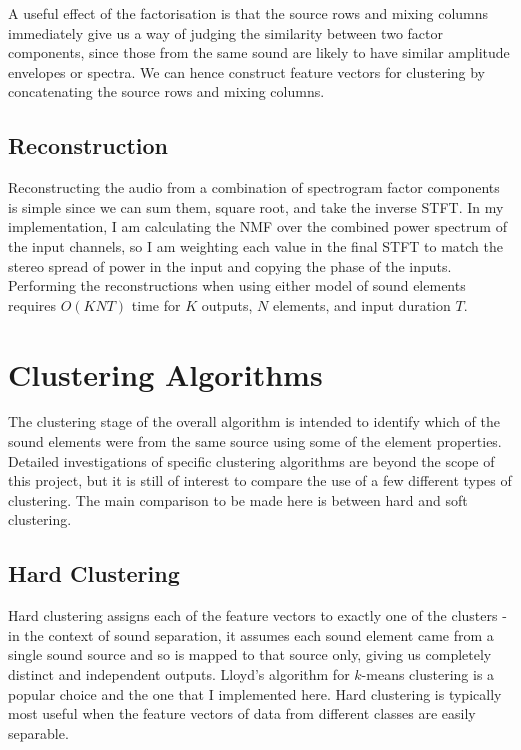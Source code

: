 \documentclass[12pt,a4paper,twoside,openright]{report}
\begin{document}
A useful effect of the factorisation is that the source rows and mixing columns immediately give us a way of judging the similarity between two factor components, since those from the same sound are likely to have similar amplitude envelopes or spectra. We can hence construct feature vectors for clustering by concatenating the source rows and mixing columns.


{\color{red}\subsection{Reconstruction}}

Reconstructing the audio from a combination of spectrogram factor components is simple since we can sum them, square root, and take the inverse STFT. In my implementation, I am calculating the NMF over the combined power spectrum of the input channels, so I am weighting each value in the final STFT to match the stereo spread of power in the input and copying the phase of the inputs. {\color{red}Performing the reconstructions when using either model of sound elements requires $ O(KNT) $ time for $ K $ outputs, $ N $ elements, and input duration $ T $.}

\section{Clustering Algorithms}

The clustering stage of the overall algorithm is intended to identify which of the sound elements were from the same source using some of the element properties. Detailed investigations of specific clustering algorithms are beyond the scope of this project, but it is still of interest to compare the use of a few different types of clustering. The main comparison to be made here is between hard and soft clustering. 

{\color{red}\subsection{Hard Clustering}}

Hard clustering assigns each of the feature vectors to exactly one of the clusters - in the context of sound separation, it assumes each sound element came from a single sound source and so is mapped to that source only, giving us completely distinct and independent outputs. Lloyd's algorithm for $ k $-means clustering \cite{lloyd1982least} is a popular choice and the one that I implemented here. Hard clustering is typically most useful when the feature vectors of data from different classes are easily separable.
\end{document}
